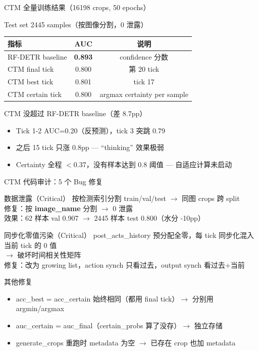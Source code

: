 \documentclass[aspectratio=169, 10pt]{beamer}
\begin{document}
\begin{frame}{CTM 全量训练结果（16198 crops, 50 epochs）}
  \begin{block}{Test set 2445 samples（按图像分割，0 泄露）}
    \begin{tabular}{lcc}
      \toprule
      \textbf{指标} & \textbf{AUC} & \textbf{说明} \\
      \midrule
      RF-DETR baseline & \textbf{0.893} & confidence 分数 \\
      CTM final tick & 0.800 & 第 20 tick \\
      CTM best tick & 0.801 & tick 17 \\
      CTM certain tick & 0.800 & argmax certainty per sample \\
      \bottomrule
    \end{tabular}
  \end{block}
  \vspace{0em}
  \begin{alertblock}{CTM 没超过 RF-DETR baseline（差 8.7pp）}
    \begin{itemize}
      \item Tick 1-2 AUC=0.20（反预测），tick 3 突跳 0.79
      \item 之后 15 tick 只涨 0.8pp — ``thinking'' 效果极弱
      \item Certainty 全程 $<$0.37，没有样本达到 0.8 阈值 — 自适应计算未启动
    \end{itemize}
  \end{alertblock}
\end{frame}

\begin{frame}{CTM 代码审计：5 个 Bug 修复}
  \begin{alertblock}{数据泄露（Critical）}
    按检测索引分割 train/val/test $\to$ 同图 crops 跨 split \\
    修复：按 \textbf{image\_name} 分割 $\to$ 0 泄露 \\
    效果：62 样本 val 0.907 $\to$ 2445 样本 test 0.800（水分 -10pp）
  \end{alertblock}
  \vspace{0em}
  \begin{alertblock}{同步化零值污染（Critical）}
    post\_acts\_history 预分配全零，每 tick 同步化混入当前 tick 的 0 值 \\
    $\to$ 破坏时间相关性矩阵 \\
    修复：改为 growing list，action synch 只看过去，output synch 看过去+当前
  \end{alertblock}
  \vspace{0em}
  \begin{block}{其他修复}
    \begin{itemize}
      \item acc\_best = acc\_certain 始终相同（都用 final tick）$\to$ 分别用 argmin/argmax
      \item auc\_certain = auc\_final（certain\_probs 算了没存）$\to$ 独立存储
      \item generate\_crops 重跑时 metadata 为空 $\to$ 已存在 crop 也加 metadata
    \end{itemize}
  \end{block}
\end{frame}
\end{document}
